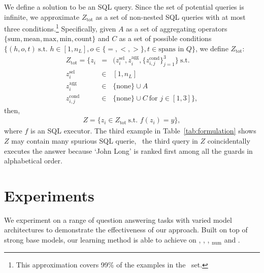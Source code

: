 \documentclass[11pt,a4paper]{article}
\begin{document}
We define a solution to be an SQL query.
Since the set of potential queries is infinite, we approximate $Z_\text{tot}$ as a set of non-nested SQL queries with at most three conditions.\footnote{This approximation covers 99\% of the examples in the \dev\ set.} 
Specifically, given $A$ as a set of aggregating operators $\{ \text{sum}, \text{mean}, \text{max}, \text{min}, \text{count} \}$ and $C$ as a set of possible conditions $\{ (h, o, t)~\text{s.t. } h \in [1, n_L], o \in \{ =,<,> \}, t \in \text{spans in } Q \}$, we define ${Z}_\text{tot}$:
\begin{eqnarray*}
    {Z}_\text{tot} = \{ z_i &=& (z_i^\text{sel}, z_i^\text{agg}, \{ z_{i,j}^\text{cond}\}_{j=1}^3 \} ~\text{s.t.} \\
    z_i^\text{sel} &\in& [1, n_L] \\
    z_i^\text{agg} &\in& \{\text{none}\} \cup A \\
    z_{i,j}^\text{cond} &\in& \{\text{none}\} \cup C~\text{for } j \in [1, 3]\}, 
\end{eqnarray*}
then,
\begin{eqnarray*}
    Z = \{ z_i  \in {Z}_\text{tot}~\text{s.t. } f(z_i) = y 
    \}, 
\end{eqnarray*}
where $f$ is an SQL executor. The third example in Table~\ref{tab:formulation} shows ${Z}$ may contain many spurious SQL querie, \eg\ the third query in ${Z}$ coincidentally executes the answer because `John Long' is ranked first among all the guards in alphabetical order.







 \section{Experiments}\label{sec:exp}We experiment on a range of question answering tasks with varied model architectures to demonstrate the effectiveness of our approach. Built on top of strong base models, our learning method is able to achieve \sota{} on \narrative, \triviaopen, \nqopen, \drop$_\text{num}$ and \wikisql.
\end{document}
